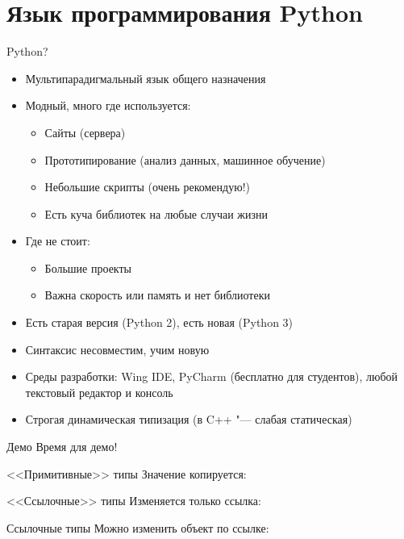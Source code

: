 \section{Язык программирования Python}

\begin{frame}[t]{Python?}
	\begin{itemize}
		\item Мультипарадигмальный язык общего назначения
		\item Модный, много где используется:
			\begin{itemize}
				\item Сайты (сервера)
				\item Прототипирование (анализ данных, машинное обучение)
				\item Небольшие скрипты (очень рекомендую!)
				\item Есть куча библиотек на любые случаи жизни
			\end{itemize}
		\item Где не стоит:
			\begin{itemize}
				\item Большие проекты
				\item Важна скорость или память и нет библиотеки
			\end{itemize}
		\item Есть старая версия (Python 2), есть новая (Python 3)
		\item Синтаксис несовместим, учим новую
		\item Среды разработки: Wing IDE, PyCharm (бесплатно для студентов), любой текстовый редактор и консоль
		\item Строгая динамическая типизация (в C++ "--- слабая статическая)
	\end{itemize}
\end{frame}

\begin{frame}[t]{Демо}
	Время для демо!
\end{frame}

\begin{frame}[t]{<<Примитивные>> типы}
	Значение копируется:
\end{frame}

\begin{frame}[t]{<<Ссылочные>> типы}
	Изменяется только ссылка:
\end{frame}

\begin{frame}[t]{Ссылочные типы}
	Можно изменить объект по ссылке:
\end{frame}

